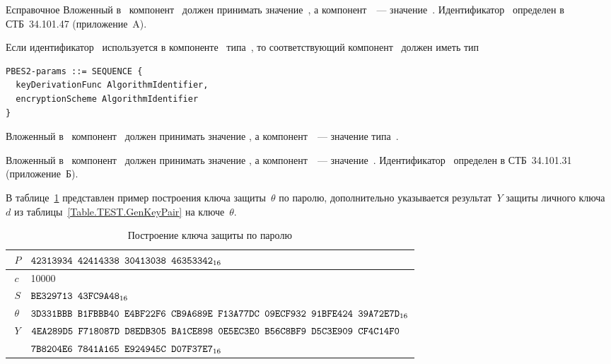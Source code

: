 \begin{appendix}{Е}{справочное}
Вложенный в~ компонент~
должен принимать значение~,
а компонент~~--- значение~.
%
Идентификатор~ 
определен в СТБ~34.101.47 (приложение~A).

Если идентификатор~ используется в
компоненте~ типа~,
то соответствующий компонент~ должен иметь тип
\begin{verbatim}
PBES2-params ::= SEQUENCE {
  keyDerivationFunc AlgorithmIdentifier,
  encryptionScheme AlgorithmIdentifier
}
\end{verbatim}

Вложенный в~ компонент~
должен принимать значение ,
а компонент~~--- значение типа~.

Вложенный в~ компонент~
должен принимать значение ,
а компонент~~--- значение~.
%
Идентификатор~ 
определен в СТБ~34.101.31 (приложение~Б).

\label{PASSWORD.Test}

В таблице~\ref{Table.PASSWORD.TestPBKDF} представлен пример построения ключа
защиты~$\theta$ по паролю, дополнительно указывается результат~$Y$ защиты
личного ключа~$d$ из таблицы~\ref{Table.TEST.GenKeyPair} на ключе~$\theta$.

\begin{table}[H]
\caption{Построение ключа защиты по паролю}\label{Table.PASSWORD.TestPBKDF}
{\small
\begin{tabular}{|l|l|}
\hline
$\phantom{\langle}P$ & 
$\texttt{42313934~42414338~30413038~46353342}_{16}$\\
% 
%
\hline
$\phantom{\langle}c$ & 
10000\\
%
\hline
$\phantom{\langle}S$ & 
$\texttt{BE329713~43FC9A48}_{16}$\\
%
\hline
\hline
$\phantom{\langle}\theta$ & 
$\texttt{3D331BBB~B1FBBB40~E4BF22F6~CB9A689E~F13A77DC~09ECF932~91BFE424~39A72E7D}_{16}$\\
\hline
\hline
$\phantom{\langle}Y$ &
$\texttt{4EA289D5~F718087D~D8EDB305~BA1CE898~0E5EC3E0~B56C8BF9~D5C3E909~CF4C14F0}$\\
&
$\texttt{7B8204E6~7841A165~E924945C~D07F37E7}_{16}$\\
\hline
\end{tabular}
}
\end{table}

\end{appendix}

